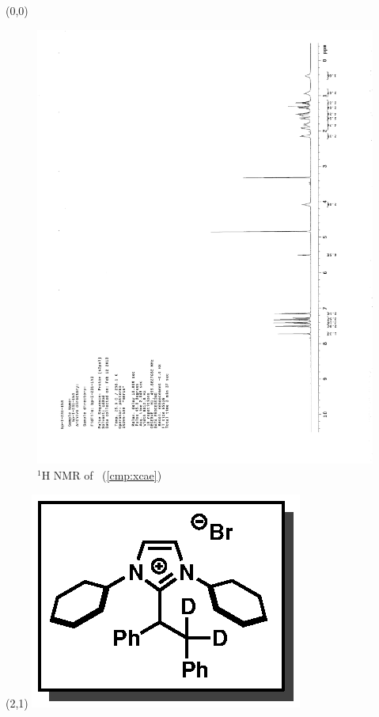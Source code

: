 \begin{textblock}{20}(0,0)
\begin{figure}[htb]
\caption{$^1$H NMR of \CMPxcae\ (\ref{cmp:xcae})}
\includegraphics[scale=0.75, trim = 0mm 0mm 0mm 5mm,
clip]{chp_alkylation/images/nmr/xcaeH}
\vspace{-100pt}
\end{figure}
\end{textblock}
\begin{textblock}{1}(2,1)
\includegraphics[scale=0.8, angle=90]{chp_alkylation/images/xcae}
\end{textblock}
